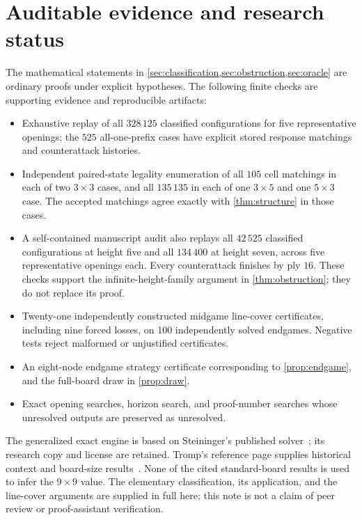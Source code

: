 \documentclass[11pt]{article}
\theoremstyle{definition}
\theoremstyle{remark}
\begin{document}
\section[Evidence and research status]{Auditable evidence and research status}\label{sec:evidence}
The mathematical statements in \cref{sec:classification,sec:obstruction,sec:oracle}
are ordinary proofs under explicit hypotheses. The following finite checks
are supporting evidence and reproducible artifacts:
\begin{itemize}
\item Exhaustive replay of all $328\,125$ classified configurations for
five representative openings; the $525$ all-one-prefix cases have explicit
stored response matchings and counterattack histories.
\item Independent paired-state legality enumeration of all $105$ cell
matchings in each of two $3\times3$ cases, and all $135\,135$ in each of
one $3\times5$ and one $5\times3$ case. The accepted matchings agree exactly
with \cref{thm:structure} in those cases.
\item A self-contained manuscript audit also replays all $42\,525$ classified
configurations at height five and all $134\,400$ at height seven, across
five representative openings each. Every counterattack finishes by ply $16$.
These checks support the infinite-height-family argument in
\cref{thm:obstruction}; they do not replace its proof.
\item Twenty-one independently constructed midgame line-cover certificates,
including nine forced losses, on 100 independently solved endgames.
Negative tests reject malformed or unjustified certificates.
\item An eight-node endgame strategy certificate corresponding to
\cref{prop:endgame}, and the full-board draw in \cref{prop:draw}.
\item Exact opening searches, horizon search, and proof-number searches
whose unresolved outputs are preserved as unresolved.
\end{itemize}

The generalized exact engine is based on Steininger's published
solver~\cite{steininger}; its research copy and license are retained.
Tromp's reference page supplies historical context and board-size
results~\cite{tromp}. None of the cited standard-board results is used to
infer the $9\times9$ value. The elementary classification, its application,
and the line-cover arguments are supplied in full here; this note is not a
claim of peer review or proof-assistant verification.
\end{document}

